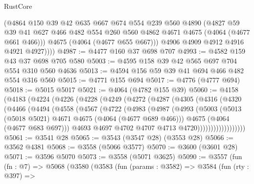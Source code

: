 \begin{lexlean}{RustCore}
\begin{coremodule}
            (@4864
              @150
              @39
              @42
              @635
              @667
              @674
              @554
              @239
              @560
              @4890
              (@4827
                @59
                @39
                @41
                @627
                @466
                @482
                @554
                @260
                @560
                @4862
                @4671
                @4675
                (@4064 (@4677 @661 @466)))
              @4675
              (@4064 (@4677 @655 @667)))
            @4906
            @4909
            @4912
            @4916
            @4921
            @4927))))
@4987 := @4477 @160 @37 @698 @707
@4993 := @4582 @159 @43 @37 @698 @705 @580
@5003 := @4595 @158 @39 @42 @565 @697 @704 @554 @310 @560 @4636
@5013 := @4594 @156 @59 @39 @41 @694 @466 @482 @554 @316 @560
@5015 := @4771 @155 @694
@5017 := @4776 (@4777 @694)
@5018 := @5015 @5017
@5021 := @4064 (@4782 @155 @39)
@5060 := @4158
    (@4183
      (@4224
        (@4226
          (@4228
            (@4249
              (@4272
                (@4287
                  (@4305
                    (@4316
                      (@4320
                        (@4466
                          (@4494
                            (@4558
                              (@4567
                                (@4722
                                  (@4983
                                    (@4987
                                      (@4993
                                        (@5003
                                          (@5013
                                            (@5018 @5021)
                                            @4671
                                            @4675
                                            (@4064 (@4677 @689 @466)))
                                          @4675
                                          (@4064 (@4677 @683 @697)))
                                        @4693
                                        @4697
                                        @4702
                                        @4707
                                        @4713
                                        @4720))))))))))))))))))
@5061 := @3541 @28
@5065 := @3543 (@3547 @28) (@3553 @28)
@5066 := @3562 @4381
@5068 := @3558 (@5066 @3577)
@5070 := @3600 (@3601 @28)
@5071 := @3596 @5070
@5073 := @3558 (@5071 @3625)
@5090 := @3557
    (fun (fn : @7) =>
    @5068
      (@3580
        (@3583
          (fun (params : @3582) =>
          @3584
            (fun (rty : @397) =>

\end{coremodule}
\end{lexlean}
